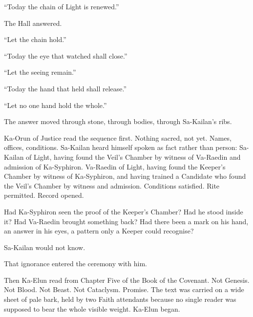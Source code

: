 “Today the chain of Light is renewed.”\par

The Hall answered.\par

“Let the chain hold.”\par

“Today the eye that watched shall close.”\par

“Let the seeing remain.”\par

“Today the hand that held shall release.”\par

“Let no one hand hold the whole.”\par

The answer moved through stone, through bodies, through Sa-Kailan’s ribs.\par

Ka-Orun of Justice read the sequence first. Nothing sacred, not yet. Names, offices, conditions. Sa-Kailan heard himself spoken as fact rather than person: Sa-Kailan of Light, having found the Veil’s Chamber by witness of Va-Raedin and admission of Ka-Syphiron. Va-Raedin of Light, having found the Keeper’s Chamber by witness of Ka-Syphiron, and having trained a Candidate who found the Veil’s Chamber by witness and admission. Conditions satisfied. Rite permitted. Record opened.\par

Had Ka-Syphiron seen the proof of the Keeper’s Chamber? Had he stood inside it? Had Va-Raedin brought something back? Had there been a mark on his hand, an answer in his eyes, a pattern only a Keeper could recognise?\par

Sa-Kailan would not know.\par

That ignorance entered the ceremony with him.\par

Then Ka-Elun read from Chapter Five of the Book of the Covenant. Not Genesis. Not Blood. Not Beast. Not Cataclysm. Promise. The text was carried on a wide sheet of pale bark, held by two Faith attendants because no single reader was supposed to bear the whole visible weight. Ka-Elun began.\par

